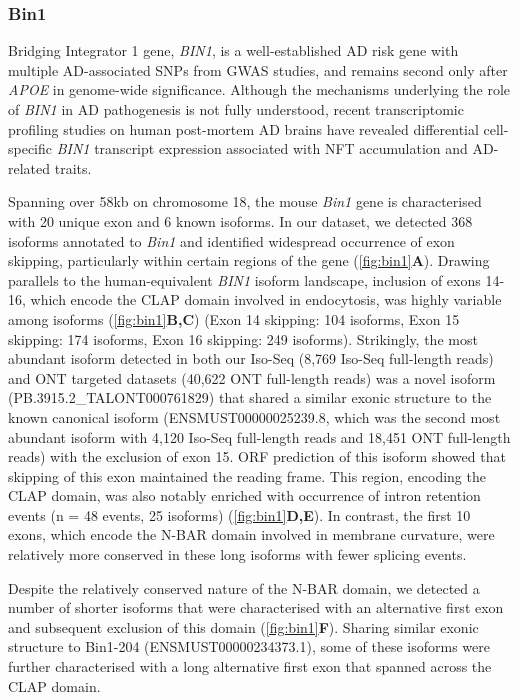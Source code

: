 \newpage
\subsubsection{Bin1}
\label{ch5: bin1_annotation}
Bridging Integrator 1 gene, \textit{BIN1}, is a well-established AD risk gene with multiple AD-associated SNPs from GWAS studies, and remains second only after \textit{APOE} in genome-wide significance\cite{Kunkle2019}. Although the mechanisms underlying the role of \textit{BIN1} in AD pathogenesis is not fully understood, recent transcriptomic profiling studies on human post-mortem AD brains have revealed differential cell-specific \textit{BIN1} transcript expression associated with NFT accumulation and AD-related traits\cite{Taga2020}. 

Spanning over 58kb on chromosome 18, the mouse \textit{Bin1} gene is characterised with 20 unique exon and 6 known isoforms. In our dataset, we detected 368 isoforms annotated to \textit{Bin1} and identified widespread occurrence of exon skipping, particularly within certain regions of the gene (\cref{fig:bin1}\textbf{A}). Drawing parallels to the human-equivalent \textit{BIN1} isoform landscape\cite{Taga2020}, inclusion of exons 14-16, which encode the CLAP domain involved in endocytosis, was highly variable among isoforms (\cref{fig:bin1}\textbf{B,C}) (Exon 14 skipping: 104 isoforms, Exon 15 skipping: 174 isoforms, Exon 16 skipping: 249 isoforms). Strikingly, the most abundant isoform detected in both our Iso-Seq (8,769 Iso-Seq full-length reads) and ONT targeted datasets (40,622 ONT full-length reads) was a novel isoform (PB.3915.2\_TALONT000761829) that shared a similar exonic structure to the known canonical isoform (ENSMUST00000025239.8, which was the second most abundant isoform with 4,120 Iso-Seq full-length reads and 18,451 ONT full-length reads) with the exclusion of exon 15. ORF prediction of this isoform showed that skipping of this exon maintained the reading frame. This region, encoding the CLAP domain, was also notably enriched with occurrence of intron retention events (n = 48 events, 25 isoforms) (\cref{fig:bin1}\textbf{D,E}). In contrast, the first 10 exons, which encode the N-BAR domain involved in membrane curvature, were relatively more conserved in these long isoforms with fewer splicing events. 

Despite the relatively conserved nature of the N-BAR domain, we detected a number of shorter isoforms that were characterised with an alternative first exon and subsequent exclusion of this domain (\cref{fig:bin1}\textbf{F}). Sharing similar exonic structure to Bin1-204 (ENSMUST00000234373.1), some of these isoforms were further characterised with a long alternative first exon that spanned across the CLAP domain. 


